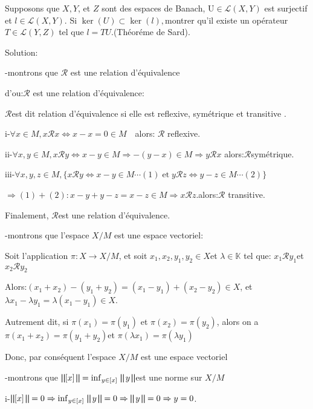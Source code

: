 \documentclass{article}
\begin{document}
Supposons que $X, Y$, et $Z$ sont des espaces de Banach, U$\in \mathcal{L} (X,
Y)$ est surjectif et $l \in \mathcal{L} (X, Y) $. Si $\ker (U) \subset \ker
(l),$montrer qu'il existe un op{\'e}rateur $T \in \mathcal{L} (Y, Z)$ tel que
$l = T U.$(Th{\'e}or{\'e}me de Sard). \ \ \ \ \ \

Solution:

-montrons que $\mathcal{R}$ est une relation d'{\'e}quivalence

d'ou:$\mathcal{R}$ est une relation d'{\'e}quivalence:

$\mathcal{R}$est dit relation d'{\'e}quivalence si elle est reflexive,
sym{\'e}trique et transitive .

i-$\forall x \in M, x\mathcal{R}x \Leftrightarrow x - x = 0 \in M \quad
$alors: $\mathcal{R}$ reflexive.

ii-$\forall x, y \in M, x\mathcal{R}y \Leftrightarrow x - y \in M \Rightarrow
- (y - x) \in M \Rightarrow y\mathcal{R}x$\quad
alors:$\mathcal{R}$sym{\'e}trique.

iii-$\forall x, y, z \in M, \{ x\mathcal{R}y \Leftrightarrow x - y \in M
\cdots (1) \ensuremath{\operatorname{et}}y\mathcal{R}z \Leftrightarrow y - z
\in M \cdots (2) \}$

$\Rightarrow (1) + (2) : x - y + y - z = x - z \in M \Rightarrow
x\mathcal{R}z.$\quad alors:$\mathcal{R}$ transitive.

Finalement, $\mathcal{R}$est une relation d'{\'e}quivalence.

-montrons que l'espace $X / M$ est une espace vectoriel:

Soit l'application $\pi : X \rightarrow X / M$, et soit $x_1, x_2, y_1, y_2
\in X$et $\lambda \in \mathbb{K}$ tel que: $x_1 \mathcal{R}y_1$et $x_2
\mathcal{R}y_2$

Alors:$(x_1 + x_2) - (y_1 + y_2) = (x_1 - y_1) + (x_2 - y_2) \in X$, et
$\lambda x_1 - \lambda y_1 = \lambda (x_1 - y_1) \in X$.

Autrement dit, si $\pi (x_1) = \pi (y_1)$ et $\pi (x_2) = \pi (y_2)$, alors on
a $\pi (x_1 + x_2) = \pi (y_1 + y_2)$et $\pi (\lambda x_1) = \pi (\lambda
y_1)$

Donc, par cons{\'e}quent l'espace $X / M$ est une espace vectoriel 

-montrons que $\bigparallel [x] \bigparallel = \inf_{y \in [x]}
\text{{\textsc{}}} \bigparallel y \bigparallel$est une norme sur $X / M$

i-$\bigparallel [x] \bigparallel = 0 \Rightarrow \inf_{y \in [x]}
\text{{\textsc{}}} \bigparallel y \bigparallel = 0 \Rightarrow \bigparallel y
\bigparallel = 0 \Rightarrow y = 0$.
\end{document}
